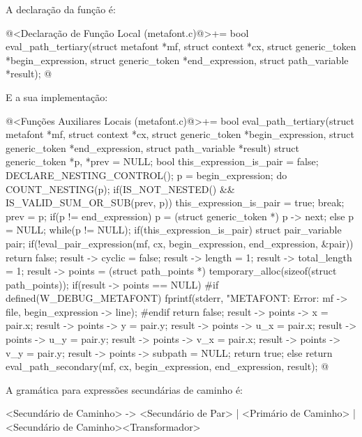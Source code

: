 {A declaração da função é:

\iniciocodigo
@<Declaração de Função Local (metafont.c)@>+=
bool eval_path_tertiary(struct metafont *mf, struct context *cx,
                        struct generic_token *begin_expression,
                        struct generic_token *end_expression,
                        struct path_variable *result);
@
\fimcodigo

E a sua implementação:

\iniciocodigo
@<Funções Auxiliares Locais (metafont.c)@>+=
bool eval_path_tertiary(struct metafont *mf, struct context *cx,
                        struct generic_token *begin_expression,
                        struct generic_token *end_expression,
                        struct path_variable *result){
  struct generic_token *p, *prev = NULL;
  bool this_expression_is_pair = false;
  DECLARE_NESTING_CONTROL();
  p = begin_expression;
  do{
    COUNT_NESTING(p);
    if(IS_NOT_NESTED() && IS_VALID_SUM_OR_SUB(prev, p)){
      this_expression_is_pair = true;
      break;
    }
    prev = p;
    if(p != end_expression)
      p = (struct generic_token *) p -> next;
    else
      p = NULL;
  }while(p != NULL);
  if(this_expression_is_pair){
    struct pair_variable pair;
    if(!eval_pair_expression(mf, cx, begin_expression, end_expression,
                            &pair))
      return false;
    result -> cyclic = false;
    result -> length = 1;
    result -> total_length = 1;
    result -> points = (struct path_points *)
                         temporary_alloc(sizeof(struct path_points));
    if(result -> points == NULL){
#if defined(W_DEBUG_METAFONT)
      fprintf(stderr, "METAFONT: Error: %
              mf -> file, begin_expression -> line);
#endif
      return false;
    }
    result -> points -> x = pair.x;
    result -> points -> y = pair.y;
    result -> points -> u_x = pair.x;
    result -> points -> u_y = pair.y;
    result -> points -> v_x = pair.x;
    result -> points -> v_y = pair.y;
    result -> points -> subpath = NULL;
    return true;
  }
  else
    return eval_path_secondary(mf, cx, begin_expression, end_expression,
                               result);
}
@
\fimcodigo


A gramática para expressões secundárias de caminho é:

\alinhaverbatim
<Secundário de Caminho> -> <Secundário de Par> | <Primário de Caminho> |
                           <Secundário de Caminho><Transformador>
\alinhanormal

}

